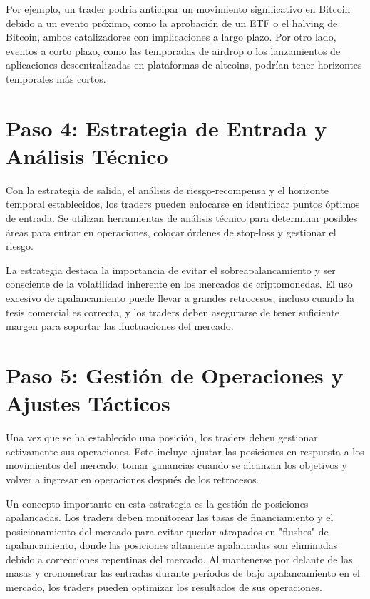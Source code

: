 \documentclass[12pt]{article}
\begin{document}
    Por ejemplo, un trader podría anticipar un movimiento significativo en Bitcoin debido a un evento próximo, como la aprobación de un ETF o el halving de Bitcoin, ambos catalizadores con implicaciones a largo plazo. Por otro lado, eventos a corto plazo, como las temporadas de airdrop o los lanzamientos de aplicaciones descentralizadas en plataformas de altcoins, podrían tener horizontes temporales más cortos.

\section{Paso 4: Estrategia de Entrada y Análisis Técnico}

    Con la estrategia de salida, el análisis de riesgo-recompensa y el horizonte temporal establecidos, los traders pueden enfocarse en identificar puntos óptimos de entrada. Se utilizan herramientas de análisis técnico para determinar posibles áreas para entrar en operaciones, colocar órdenes de stop-loss y gestionar el riesgo.

    La estrategia destaca la importancia de evitar el sobreapalancamiento y ser consciente de la volatilidad inherente en los mercados de criptomonedas. El uso excesivo de apalancamiento puede llevar a grandes retrocesos, incluso cuando la tesis comercial es correcta, y los traders deben asegurarse de tener suficiente margen para soportar las fluctuaciones del mercado.

\section{Paso 5: Gestión de Operaciones y Ajustes Tácticos}

    Una vez que se ha establecido una posición, los traders deben gestionar activamente sus operaciones. Esto incluye ajustar las posiciones en respuesta a los movimientos del mercado, tomar ganancias cuando se alcanzan los objetivos y volver a ingresar en operaciones después de los retrocesos.

    Un concepto importante en esta estrategia es la gestión de posiciones apalancadas. Los traders deben monitorear las tasas de financiamiento y el posicionamiento del mercado para evitar quedar atrapados en "flushes" de apalancamiento, donde las posiciones altamente apalancadas son eliminadas debido a correcciones repentinas del mercado. Al mantenerse por delante de las masas y cronometrar las entradas durante períodos de bajo apalancamiento en el mercado, los traders pueden optimizar los resultados de sus operaciones.
\end{document}
